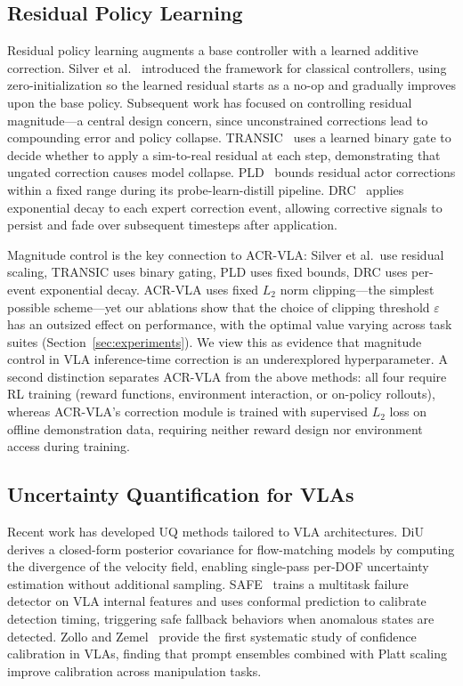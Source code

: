 \subsection{Residual Policy Learning}

Residual policy learning augments a base controller with a learned additive correction.
Silver et al.~\cite{silver2018residual} introduced the framework for classical controllers, using zero-initialization so the learned residual starts as a no-op and gradually improves upon the base policy.
Subsequent work has focused on controlling residual magnitude---a central design concern, since unconstrained corrections lead to compounding error and policy collapse.
TRANSIC~\cite{jiang2024transic} uses a learned binary gate to decide whether to apply a sim-to-real residual at each step, demonstrating that ungated correction causes model collapse.
PLD~\cite{xiao2026pld} bounds residual actor corrections within a fixed range during its probe-learn-distill pipeline.
DRC~\cite{pan2025drc} applies exponential decay to each expert correction event, allowing corrective signals to persist and fade over subsequent timesteps after application.

Magnitude control is the key connection to ACR-VLA: Silver et al.\ use residual scaling, TRANSIC uses binary gating, PLD uses fixed bounds, DRC uses per-event exponential decay.
ACR-VLA uses fixed $L_2$ norm clipping---the simplest possible scheme---yet our ablations show that the choice of clipping threshold $\varepsilon$ has an outsized effect on performance, with the optimal value varying across task suites (Section~\ref{sec:experiments}).
We view this as evidence that magnitude control in VLA inference-time correction is an underexplored hyperparameter.
A second distinction separates ACR-VLA from the above methods: all four require RL training (reward functions, environment interaction, or on-policy rollouts), whereas ACR-VLA's correction module is trained with supervised $L_2$ loss on offline demonstration data, requiring neither reward design nor environment access during training.

\subsection{Uncertainty Quantification for VLAs}

Recent work has developed UQ methods tailored to VLA architectures.
DiU~\cite{xing2026diu} derives a closed-form posterior covariance for flow-matching models by computing the divergence of the velocity field, enabling single-pass per-DOF uncertainty estimation without additional sampling.
SAFE~\cite{gu2025safe} trains a multitask failure detector on VLA internal features and uses conformal prediction to calibrate detection timing, triggering safe fallback behaviors when anomalous states are detected.
Zollo and Zemel~\cite{zollo2025vla_calibration} provide the first systematic study of confidence calibration in VLAs, finding that prompt ensembles combined with Platt scaling improve calibration across manipulation tasks.

